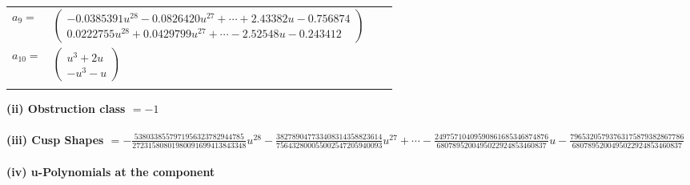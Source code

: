 \documentclass[1p]{elsarticle_modified}
\theoremstyle{definition}
\begin{document}
\begin{tabular}{m{7pt} m{180pt} m{7pt} m{180pt} }
\flushright $a_{9}=$&$\begin{pmatrix}-0.0385391 u^{28}-0.0826420 u^{27}+\cdots+2.43382 u-0.756874\\0.0222755 u^{28}+0.0429799 u^{27}+\cdots-2.52548 u-0.243412\end{pmatrix}$ \\
\flushright $a_{10}=$&$\begin{pmatrix}u^3+2 u\\- u^3- u\end{pmatrix}$\\&\end{tabular}
\flushleft \textbf{(ii) Obstruction class $= -1$}\\~\\
\flushleft \textbf{(iii) Cusp Shapes $= -\frac{5380338557971956323782944785}{27231580801980091699413843348} u^{28}-\frac{382789047733408314358823614}{756432800055002547205940093} u^{27}+\cdots-\frac{24975710409590861685346874876}{6807895200495022924853460837} u-\frac{79653205793763175879382867786}{6807895200495022924853460837}$}\\~\\
\newpage\renewcommand{\arraystretch}{1}
\flushleft \textbf{(iv) u-Polynomials at the component}\newline \\
\end{document}

